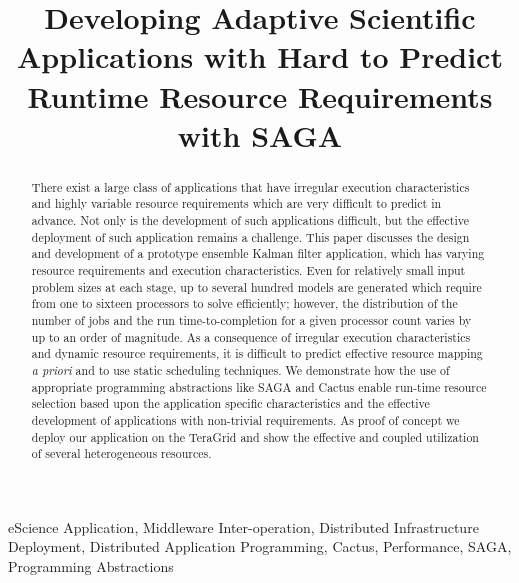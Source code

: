 \documentclass[conference,final]{IEEEtran}
\begin{document}
\title{\large Developing Adaptive Scientific Applications with Hard to
  Predict Runtime Resource Requirements with SAGA}

\author{  
}

\maketitle

 \begin{abstract}
   There exist a large class of applications that have irregular
   execution characteristics and highly variable resource requirements
   which are very difficult to predict in advance.  Not only is the
   development of such applications difficult, but the effective
   deployment of such application remains a challenge.  This paper
   discusses the design and development of a prototype ensemble Kalman
   filter application, which has varying resource requirements and
   execution characteristics. Even for relatively small input problem
   sizes at each stage, up to several hundred models are generated
   which require from one to sixteen processors to solve efficiently;
   however, the distribution of the number of jobs and the run
   time-to-completion for a given processor count varies by up to an
   order of magnitude.  As a consequence of irregular execution
   characteristics and dynamic resource requirements, it is difficult
   to predict effective resource mapping {\it a priori} and to use
   static scheduling techniques.  We demonstrate how the use of
   appropriate programming abstractions like SAGA and Cactus enable
   run-time resource selection based upon the application specific
   characteristics and the effective development of applications with
   non-trivial requirements.  As proof of concept we deploy our
   application on the TeraGrid and show the effective and coupled
   utilization of several heterogeneous resources.
 \end{abstract}

 \begin{keywords}
   eScience Application, Middleware Inter-operation, Distributed
   Infrastructure Deployment, Distributed Application Programming,
   Cactus, Performance, SAGA, Programming Abstractions
 \end{keywords}
\end{document}
